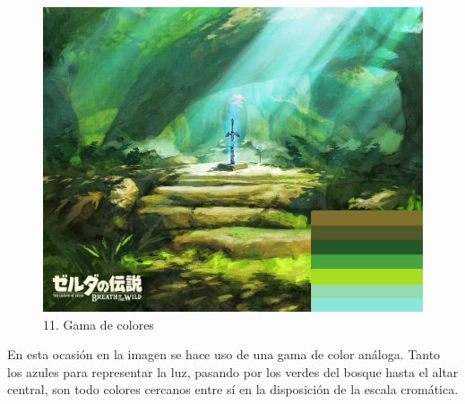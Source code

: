 \documentclass[12pt]{article}
\begin{document}
    \begin{figure}[H]
      \centering
      \includegraphics[width=\textwidth]{images/Carlos/12/Gamma.jpg}
      \caption{\small 11. Gama de colores}
    \end{figure}
    En esta ocasión en la imagen se hace uso de una gama de color análoga. Tanto los azules para representar la luz, pasando por los verdes del bosque hasta el altar central, son todo colores cercanos entre sí en la disposición de la escala cromática.
\end{document}
